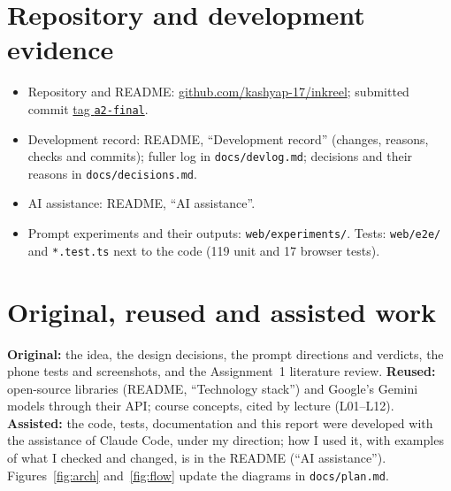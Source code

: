 \documentclass[11pt,a4paper]{article}
\newcommand{\repo}{\href{https://github.com/kashyap-17/inkreel}{github.com/kashyap-17/inkreel}}
\newcommand{\commit}{\href{https://github.com/kashyap-17/inkreel/tree/a2-final}{tag \texttt{a2-final}}}
\begin{document}
\clearpage
\section*{Repository and development evidence}
\begin{itemize}\setlength{\itemsep}{0pt}
\item Repository and README: \repo; submitted commit \commit.
\item Development record: README, ``Development record'' (changes, reasons, checks and commits);
fuller log in \texttt{docs/devlog.md}; decisions and their reasons in \texttt{docs/decisions.md}.
\item AI assistance: README, ``AI assistance''.
\item Prompt experiments and their outputs: \texttt{web/experiments/}. Tests: \texttt{web/e2e/}
and \texttt{*.test.ts} next to the code (119 unit and 17 browser tests).
\end{itemize}

\section*{Original, reused and assisted work}
{\small \textbf{Original:} the idea, the design decisions, the prompt directions and verdicts, the
phone tests and screenshots, and the Assignment~1 literature review. \textbf{Reused:} open-source
libraries (README, ``Technology stack'') and Google's Gemini models through their API; course
concepts, cited by lecture (L01--L12). \textbf{Assisted:} the code, tests, documentation and
this report were developed with the assistance of Claude Code, under my direction; how I used it,
with examples of what I checked and changed, is in the README (``AI assistance''). Figures~\ref{fig:arch}
and~\ref{fig:flow} update the diagrams in \texttt{docs/plan.md}.}



\end{document}
